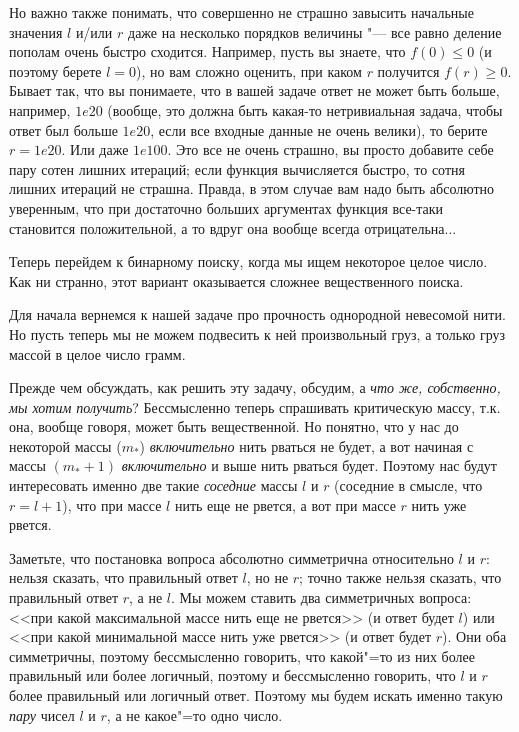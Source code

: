 \documentclass[a4paper,10pt]{problems}
\begin{document}
Но важно также понимать, что совершенно не страшно завысить начальные значения $l$ и/или $r$ даже на несколько порядков величины
"--- все равно деление пополам очень быстро сходится.
Например, пусть вы знаете, что $f(0)\leq 0$ (и поэтому берете $l=0$), но вам сложно оценить, при каком $r$ получится $f(r)\geq 0$.
Бывает так, что вы понимаете, что в вашей задаче ответ не может быть больше, например, $1e20$ (вообще, это должна быть
какая-то нетривиальная задача, чтобы ответ был больше $1e20$, если все входные данные не очень велики), то берите $r=1e20$.
Или даже $1e100$. 
Это все не очень страшно, вы просто добавите себе пару сотен лишних итераций; если функция вычисляется быстро, то сотня лишних итераций не страшна.
Правда, в этом случае вам надо быть абсолютно уверенным, что при достаточно больших аргументах функция все-таки становится положительной,
а то вдруг она вообще всегда отрицательна...

Теперь перейдем к бинарному поиску, когда мы ищем некоторое целое число. Как ни странно, этот вариант оказывается сложнее вещественного поиска.

 Для начала вернемся к нашей задаче про прочность однородной невесомой нити. 
Но пусть теперь мы не можем подвесить к ней произвольный груз, а только груз массой в целое число грамм.

Прежде чем обсуждать, как решить эту задачу, обсудим, а \textit{что же, собственно, мы хотим получить}? 
Бессмысленно теперь спрашивать критическую массу, т.к. она, вообще говоря, может быть вещественной.
Но понятно, что у нас до некоторой массы ($m_*$) \textit{включительно} нить рваться не будет, а вот начиная с массы
$(m_*+1)$ \textit{включительно} и выше нить рваться будет. 
Поэтому нас будут интересовать именно две такие \textit{соседние} массы $l$ и $r$ (соседние в смысле, что $r=l+1$), что при массе $l$ нить еще не рвется,
а вот при массе $r$ нить уже рвется.

Заметьте, что постановка вопроса абсолютно симметрична относительно $l$ и $r$: нельзя сказать, что правильный ответ $l$, но не $r$; 
точно также нельзя сказать, что правильный ответ $r$, а не $l$. 
Мы можем ставить два симметричных вопроса: <<при какой максимальной массе нить еще не рвется>> (и ответ будет $l$)
или <<при какой минимальной массе нить уже рвется>> (и ответ будет $r$).
Они оба симметричны, поэтому бессмысленно говорить, что какой"=то из них более правильный или более логичный, поэтому
и бессмысленно говорить, что $l$ и $r$ более правильный или логичный ответ. 
Поэтому мы будем искать именно такую \textit{пару} чисел $l$ и $r$, а не какое"=то одно число.
\end{document}
